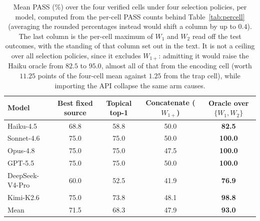 \documentclass[11pt]{article}
\theoremstyle{plain}
\theoremstyle{definition}
\theoremstyle{remark}
\begin{document}
\begin{table}[t]
\centering
\begin{tabular}{@{}lcccc@{}}
\toprule
Model & Best fixed source & Topical top-1 & Concatenate ($W_{1+}$) & Oracle over $\{W_1,W_2\}$ \\
\midrule
Haiku-4.5       & 68.8 & 58.8 & 50.0 & \textbf{82.5} \\
Sonnet-4.6      & 75.0 & 75.0 & 50.0 & \textbf{100.0} \\
Opus-4.8        & 75.0 & 75.0 & 47.5 & \textbf{100.0} \\
GPT-5.5         & 75.0 & 75.0 & 50.0 & \textbf{100.0} \\
DeepSeek-V4-Pro & 60.0 & 52.5 & 41.9 & \textbf{76.9} \\
Kimi-K2.6       & 75.0 & 73.8 & 48.1 & \textbf{98.8} \\
\midrule
Mean            & 71.5 & 68.3 & 47.9 & \textbf{93.0} \\
\bottomrule
\end{tabular}
\caption{Mean PASS (\%) over the four verified cells under four selection policies, per model,
computed from the per-cell PASS counts behind Table~\ref{tab:percell} (averaging the rounded
percentages instead would shift a column by up to $0.4$). The last column is the per-cell maximum
of $W_1$ and $W_2$ read off the test outcomes, with the standing of that column set out in the
text. It is not a ceiling over all selection policies, since it excludes $W_{1+}$: admitting it
would raise the Haiku oracle from $82.5$ to $95.0$, almost all of that from the encoding cell
(worth $11.25$ points of the four-cell mean against $1.25$ from the trap cell), while importing
the API collapse the same arm causes.}
\label{tab:policies}
\end{table}
\end{document}
